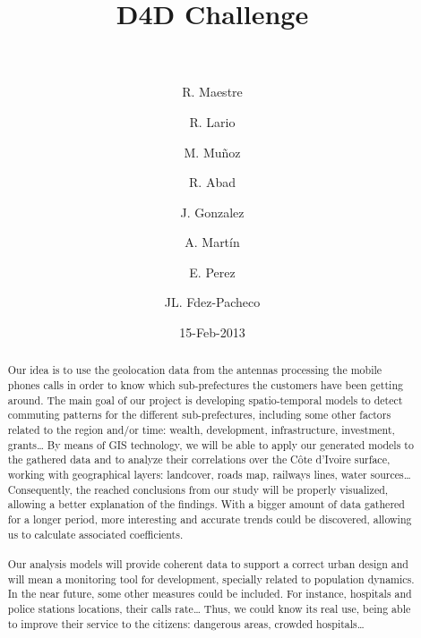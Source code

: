 \documentclass[a4paper,11pt]{article}
\begin{document}
\title{{\huge D4D Challenge} \\  \\ }

\author[1]{R. Maestre}
\author[1]{R. Lario}
\author[1]{M. Muñoz }
\author[1]{R. Abad}
\author[1]{J. Gonzalez}
\author[1]{A. Martín}

\author[2]{E. Perez}

\author[3]{JL. Fdez-Pacheco}



\date{15-Feb-2013}
\maketitle

\begin{abstract} 
Our idea is to use the geolocation data from the antennas processing the mobile phones calls in order to know which sub-prefectures the customers have been getting around. The main goal of our project is developing spatio-temporal models to detect commuting patterns for the different sub-prefectures, including some other factors related to the region and/or time: wealth, development, infrastructure, investment, grants…
By means of GIS technology, we will be able to apply our generated models to the gathered data and to analyze their correlations over the Côte d’Ivoire surface, working with geographical layers: landcover, roads map, railways lines, water sources… Consequently, the reached conclusions from our study will be properly visualized, allowing a better explanation of the findings. With a bigger amount of data gathered for a longer period, more interesting and accurate trends could be discovered, allowing us to calculate associated coefficients.
\\
\\
Our analysis models will provide coherent data to support a correct urban design and will mean a monitoring tool for development, specially related to population dynamics.
In the near future, some other measures could be included. For instance, hospitals and police stations locations, their calls rate… Thus, we could know its real use, being able to improve their service to the citizens: dangerous areas, crowded hospitals…
\\
\\
\end{abstract}
\end{document}
